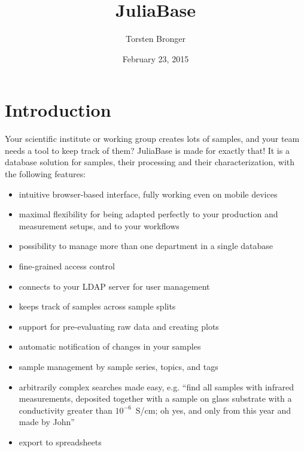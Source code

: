 \documentclass[a4paper,11pt,english]{sphinxmanual}
\title{JuliaBase}
\date{February 23, 2015}
\author{Torsten Bronger}
\begin{document}
\maketitle
\tableofcontents
{}\label{toc::doc}



\chapter{Introduction}
\label{index:introduction}\label{index::doc}\label{index:juliabase}
Your scientific institute or working group creates lots of samples, and your
team needs a tool to keep track of them?  JuliaBase is made for exactly that!
It is a database solution for samples, their processing and their
characterization, with the following features:
\begin{itemize}
\item {} 
intuitive browser-based interface, fully working even on mobile devices

\item {} 
maximal flexibility for being adapted perfectly to your production and
measurement setups, and to your workflows

\item {} 
possibility to manage more than one department in a single database

\item {} 
fine-grained access control

\item {} 
connects to your LDAP server for user management

\item {} 
keeps track of samples across sample splits

\item {} 
support for pre-evaluating raw data and creating plots

\item {} 
automatic notification of changes in your samples

\item {} 
sample management by sample series, topics, and tags

\item {} 
arbitrarily complex searches made easy, e.g. “find all samples with infrared
measurements, deposited together with a sample on glass substrate with a
conductivity greater than \(10^{-6}\) S/cm; oh yes, and only from this year and made
by John”

\item {} 
export to spreadsheets


\end{itemize}
\end{document}
